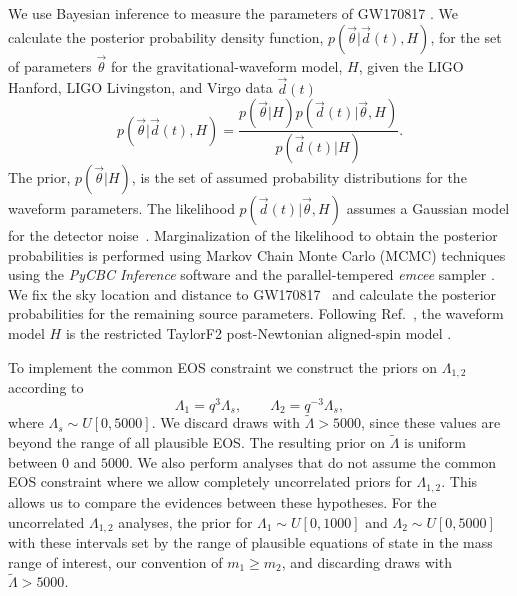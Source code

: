 We use Bayesian inference to measure the parameters of GW170817 \cite{Christensen:2001cr}. We calculate the posterior probability density function, $p(\vec{\theta}|\vec{d}(t),H)$, for the set of parameters $\vec{\theta}$ for the gravitational-waveform model, $H$, given the LIGO Hanford, LIGO Livingston, and Virgo data $\vec{d}(t)$~\cite{Vallisneri:2014vxa,gw170817-losc}
\begin{equation}
p(\vec{\theta}|\vec{d}(t),H) = \frac{p(\vec{\theta}|H) p(\vec{d}(t)|\vec{\theta},H)}{p(\vec{d}(t)|H)}.
\label{eq:common_rad_postpdf}
\end{equation}
The prior, $p(\vec{\theta}|H)$, is the set of assumed probability distributions for the waveform parameters. The likelihood $p(\vec{d}(t)|\vec{\theta},H)$ assumes a Gaussian model for the detector noise~\cite{Rover:2006bb}. Marginalization of the likelihood to obtain the posterior probabilities is performed using Markov Chain Monte Carlo (MCMC) techniques using the \textit{PyCBC Inference} software \cite{Biwer:2018osg,alex_nitz_2018_1208115} and the parallel-tempered \textit{emcee} sampler \cite{emcee,vousden:2016,mcmc}. We fix the sky location and distance to GW170817~\cite{Soares-Santos:2017lru,Cantiello:2018ffy} and calculate the posterior probabilities for the remaining source parameters. Following Ref.~\cite{TheLIGOScientific:2017qsa}, the waveform model $H$ is the restricted TaylorF2 post-Newtonian aligned-spin model \cite{Sathyaprakash:1991mt,Buonanno:2009zt,Arun:2008kb,Mikoczi:2005dn,Bohe:2013cla,Vines:2011ud}.

To implement the common EOS constraint we construct the priors on $\Lambda_{1,2}$ according to
\begin{equation}
\Lambda_1=q^3\Lambda_s,\qquad\Lambda_2=q^{-3}\Lambda_s,
\label{eq:lambdas}\end{equation}
where $\Lambda_s \sim U[0,5000]$. We discard draws with 
$\tilde{\Lambda} > 5000$, since these values are beyond the range of all plausible EOS. The resulting prior on $\tilde\Lambda$ is uniform between $0$ and $5000$.  We also perform analyses that do not assume the common EOS constraint where we allow completely uncorrelated priors for $\Lambda_{1,2}$. This allows us to compare the evidences between these hypotheses. For the uncorrelated $\Lambda_{1,2}$ analyses, the prior for $\Lambda_1 \sim U[0,1000]$ and $\Lambda_2 \sim U[0,5000]$ with these intervals set by the range of plausible equations of state in the mass range of interest, our convention of $m_1 \geq m_2$, and discarding draws with $\tilde\Lambda > 5000$.

